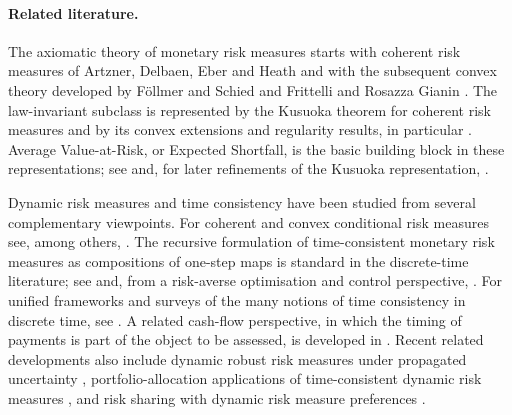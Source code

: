 \documentclass[a4paper]{amsart}
\theoremstyle{definition}
\begin{document}
\paragraph{\bf Related literature.}
The axiomatic theory of monetary risk measures starts with coherent risk
measures of Artzner, Delbaen, Eber and Heath \cite{ArDeEbHe99} and with the
subsequent convex theory developed by F{\"o}llmer and Schied
\cite{FoSc02,FollmerSchied2004} and Frittelli and Rosazza Gianin
\cite{FrRoGi02}. The law-invariant subclass is represented by the Kusuoka
theorem for coherent risk measures \cite{Kusuoka2001} and by its convex
extensions and regularity results, in particular
\cite{FrittelliRosazzaGianin2005,JoScTo06,CheriditoLi2008}. Average
Value-at-Risk, or Expected Shortfall, is the basic building block in these
representations; see \cite{AcerbiTasche2002,RockafellarUryasev2002} and, for
later refinements of the Kusuoka representation, \cite{Shapiro2013Kusuoka}.

Dynamic risk measures and time consistency have been studied from several
complementary viewpoints. For coherent and convex conditional risk measures
see, among others,
\cite{Riedel2004,DetlefsenScandolo2005,Artzner2007,CheriditoDelbaenKupper2006,
FollmerPenner2006,delbaen2006,DelbaenPengRosazzaGianin2010,AcciaioPenner2011,
BionNadal2008}. The recursive formulation of time-consistent monetary risk
measures as compositions of one-step maps is standard in the discrete-time
literature; see \cite{CheriditoKupper2011,RuszczynskiShapiro2006,ruszczynski2010risk} and, from a
risk-averse optimisation and control perspective,
\cite{DentchevaRuszczynski2024DynamicRisk}. For unified frameworks and surveys
of the many notions of time consistency in discrete time, see
\cite{BieleckiCialencoPitera2018,BieleckiCialencoPitera2017Survey}. A related
cash-flow perspective, in which the timing of payments is part of the object to
be assessed, is developed in \cite{AcciaioFollmerPenner2012}. Recent related
developments also include dynamic robust risk measures under propagated
uncertainty \cite{MorescoMailhotPesenti2025,coache2026robust}, portfolio-allocation
applications of time-consistent dynamic risk measures
\cite{PesentiJaimungalSaporitoTargino2025}, and risk sharing with dynamic risk measure preferences \cite{tam2026dynamic}.
\end{document}
